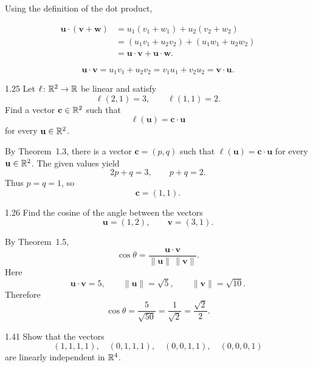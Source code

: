 \documentclass[11pt,oneside]{article}
\begin{document}
\begin{solution}
Using the definition of the dot product,
\begin{problemsubparts}
    \item
    \begin{align*}
        \mathbf u\cdot(\mathbf v+\mathbf w)
        &=u_1(v_1+w_1)+u_2(v_2+w_2)\\
        &=(u_1v_1+u_2v_2)+(u_1w_1+u_2w_2)\\
        &=\mathbf u\cdot\mathbf v+\mathbf u\cdot\mathbf w.
    \end{align*}
    \item
    \[
        \mathbf u\cdot\mathbf v
        =u_1v_1+u_2v_2
        =v_1u_1+v_2u_2
        =\mathbf v\cdot\mathbf u.
    \]
\end{problemsubparts}
\end{solution}

\begin{problem}{1.25}
Let $\ell\colon\mathbb{R}^2\to\mathbb{R}$ be linear and satisfy
\[
    \ell(2,1)=3,
    \qquad
    \ell(1,1)=2.
\]
Find a vector $\mathbf c\in\mathbb{R}^2$ such that
\[
    \ell(\mathbf u)=\mathbf c\cdot\mathbf u
\]
for every $\mathbf u\in\mathbb{R}^2$.
\end{problem}

\begin{solution}
By Theorem~1.3, there is a vector $\mathbf c=(p,q)$ such that $\ell(\mathbf u)=\mathbf c\cdot\mathbf u$ for every $\mathbf u\in\mathbb{R}^2$. The given values yield
\[
    2p+q=3,
    \qquad
    p+q=2.
\]
Thus $p=q=1$, so
\[
    \boxed{\mathbf c=(1,1)}.
\]
\end{solution}

\begin{problem}{1.26}
Find the cosine of the angle between the vectors
\[
    \mathbf u=(1,2),
    \qquad
    \mathbf v=(3,1).
\]
\end{problem}

\begin{solution}
By Theorem~1.5,
\[
    \cos\theta
    =\frac{\mathbf u\cdot\mathbf v}{\|\mathbf u\|\,\|\mathbf v\|}.
\]
Here
\[
    \mathbf u\cdot\mathbf v=5,
    \qquad
    \|\mathbf u\|=\sqrt5,
    \qquad
    \|\mathbf v\|=\sqrt{10}.
\]
Therefore
\[
    \boxed{\cos\theta=\frac{5}{\sqrt{50}}=\frac{1}{\sqrt2}=\frac{\sqrt2}{2}}.
\]
\end{solution}

\begin{problem}{1.41}
Show that the vectors
\[
    (1,1,1,1),
    \quad
    (0,1,1,1),
    \quad
    (0,0,1,1),
    \quad
    (0,0,0,1)
\]
are linearly independent in $\mathbb{R}^4$.
\end{problem}
\end{document}
